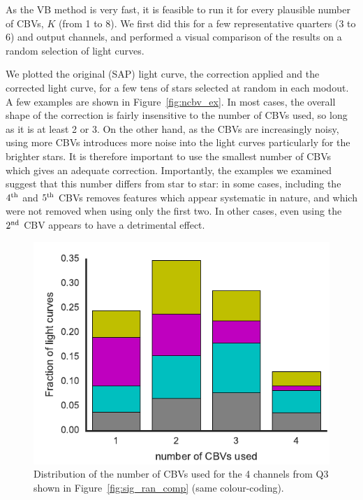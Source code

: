 \documentclass[useAMS,usenatbib]{mn2e}
\begin{document}
As the VB method is very fast, it is feasible to run it for every plausible
number of CBVs, $K$ (from 1 to 8). We first did this for a few
representative quarters (3 to 6) and output
channels, and performed a visual comparison of the results on a random
selection of light curves. 

We plotted the original (SAP) light curve, the correction
applied and the corrected light curve, for a few tens of stars
selected at random in each modout. A few examples are shown in
Figure~\ref{fig:ncbv_ex}. In most cases, the overall
shape of the correction is fairly insensitive to the number of CBVs
used, so long as it is at least 2 or 3. On the other hand, as the
CBVs are increasingly noisy, using more CBVs introduces more noise
into the light curves particularly for the brighter stars. It is
therefore important to use the smallest number of CBVs which gives an
adequate correction. Importantly, the examples we examined 
suggest that this number differs from star to star: in some cases,
including the $4^{\rm th}$ and $5^{\rm th}$ CBVs removes features
which appear systematic in nature, and which were not removed when
using only the first two. In other cases, even using the $2^{\rm nd}$ CBV
appears to have a detrimental effect.

\begin{figure}
  \centering
  \includegraphics[width=\linewidth]{arc2_ncbv_q3.pdf}
  \caption{Distribution of the number of CBVs used for the 4 channels from Q3 shown in Figure~\ref{fig:sig_ran_comp} (same colour-coding).}
  \label{fig:ncbv}
\end{figure}
\end{document}
